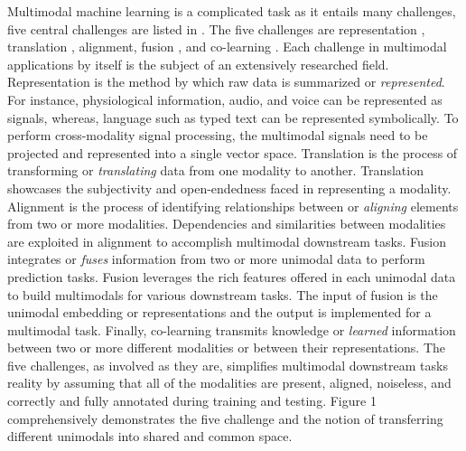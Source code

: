 \documentclass[conference]{IEEEtran}
\begin{document}
 Multimodal machine learning is a complicated task as it entails many challenges, five central challenges are listed in \cite{baltruvsaitis2018multimodal}. The five challenges are representation \cite{bench1}, translation \cite{translation}, alignment, fusion \cite{fusion}, and co-learning \cite{co-learn}. Each challenge in multimodal applications by itself is the subject of an extensively researched field. Representation is the method by which raw data is summarized or \textit{represented}. For instance, physiological information, audio, and voice can be represented as signals, whereas, language such as typed text can be represented symbolically. To perform cross-modality signal processing, the multimodal signals need to be projected and represented into a single vector space. Translation is the process of transforming or \textit{translating} data from one modality to another. Translation showcases the subjectivity and open-endedness faced in representing a modality.  Alignment is the process of identifying relationships between or \textit{aligning} elements from two or more modalities. Dependencies and similarities between modalities are exploited in alignment to accomplish multimodal downstream tasks. Fusion integrates or \textit{fuses} information from two or more unimodal data to perform prediction tasks. Fusion leverages the rich features offered in each unimodal data to build multimodals for various downstream tasks. The input of fusion is the unimodal embedding or representations and the output is implemented for a multimodal task. Finally, co-learning transmits knowledge or \textit{learned} information between two or more different modalities or between their representations. The five challenges, as involved as they are, simplifies multimodal downstream tasks reality by assuming that all of the modalities are present, aligned, noiseless, and correctly and fully annotated during training and testing. Figure 1 comprehensively demonstrates the five challenge and the notion of transferring different unimodals into shared and common space.                      
 
\end{document}
